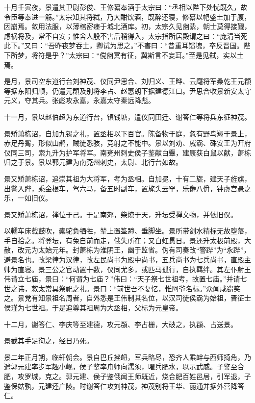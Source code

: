 \documentclass[12pt,UTF8]{ctexbook}
\begin{document}
十月壬寅夜，景遣其卫尉彭俊、王修纂奉酒于太宗曰：“丞相以陛下处忧既久，故令臣等奉进一觞。”太宗知其将弑，乃大酣饮酒，既醉还寝，修纂以帊盛土加于腹，因崩焉。敛用法服，以薄棺密瘗于城北酒库。初，太宗久见幽絷，朝士莫得接觐，虑祸将及，常不自安；惟舍人殷不害后稍得入，太宗指所居殿谓之曰：“庞涓当死此下。”又曰：“吾昨夜梦吞土，卿试为思之。”不害曰：“昔重耳馈塊，卒反晋国。陛下所梦，将符是乎？”太宗曰：“傥幽冥有征，冀斯言不妄耳。”至是见弑，实以土焉。

是月，景司空东道行台刘神茂、仪同尹思合、刘归义、王晔、云麾将军桑乾王元頵等据东阳归顺，仍遣元頵及别将李占、赵惠朗下据建德江口。尹思合收景新安太守元义，夺其兵。张彪攻永嘉，永嘉太守秦远降彪。

十一月，景以赵伯超为东道行台，镇钱塘，遣仪同田迁、谢答仁等将兵东征神茂。

景矫萧栋诏，自加九锡之礼，置丞相以下百官。陈备物于庭，忽有野鸟翔于景上，赤足丹觜，形似山鹊，贼徒悉骇，竞射之不能中。景以刘劝、戚霸、硃安王为开府仪同三司，索九升为护军将军。南兗州刺史侯子鉴献白麞，建康获白鼠以献，萧栋归之于景。景以郭元建为南兗州刺史，太尉、北行台如故。

景又矫萧栋诏，追崇其祖为大将军，考为丞相。自加冕，十有二旒，建天子旌旗，出警入跸，乘金根车，驾六马，备五时副车，置旄头云罕，乐儛八佾，钟虡宫悬之乐，一如旧仪。

景又矫萧栋诏，禅位于己。于是南郊，柴燎于天，升坛受禅文物，并依旧仪。

以轜车床载鼓吹，橐驼负牺牲，辇上置筌蹄、垂脚坐。景所带剑水精标无故堕落，手自拾之。将登坛，有兔自前而走，俄失所在；又白虹贯日。景还升太极前殿，大赦，改元为太始元年。封萧栋为淮阴王，幽于监省。伪有司奏改“警跸”为“永跸”，避景名也。改梁律为汉律，改左民尚书为殿中尚书，五兵尚书为七兵尚书，直殿主帅为直寝。景三公之官动置十数，仪同尤多，或匹马孤行，自执羁绊。其左仆射王伟请立七庙，景曰：“何谓为七庙？”伟曰：“天子祭七世祖考，故置七庙。”并请七世之讳，敕太常具祭祀之礼。景曰：“前世吾不复忆，惟阿爷名标。”众闻咸窃笑之。景党有知景祖名周者，自外悉是王伟制其名位，以汉司徒侯霸为始祖，晋征士侯瑾为七世祖。于是追尊其祖周为大丞相，父标为元皇帝。

十二月，谢答仁、李庆等至建德，攻元頵、李占栅，大破之，执頵、占送景。

景截其手足徇之，经日乃死。

景二年正月朔，临轩朝会。景自巴丘挫衄，军兵略尽，恐齐人乘衅与西师掎角，乃遣郭元建率步军趣小岘，侯子鉴率舟师向濡须，曜兵肥水，以示武威。子鉴至合肥，攻罗城，克之。郭元建、侯子鉴俄闻王师既近，烧合肥百姓邑居，引军退，子鉴保姑孰，元建还广陵。时谢答仁攻刘神茂，神茂别将王华、丽通并据外营降答仁。
\end{document}
